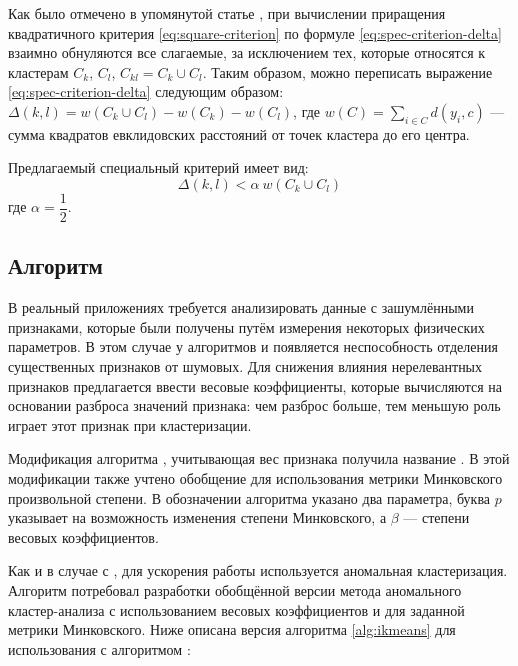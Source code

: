 \documentclass[12pt]{diploma}
\begin{document}
	Как было отмечено в упомянутой статье \cite{spec-criterion}, при вычислении приращения квадратичного критерия \eqref{eq:square-criterion}  по формуле \eqref{eq:spec-criterion-delta} взаимно обнуляются все слагаемые, за исключением тех, которые относятся к кластерам $ C_k $, $ C_l $, $ C_{kl} =C_k \cup C_l $. Таким образом, можно переписать выражение \eqref{eq:spec-criterion-delta} следующим образом: $ 		\Delta(k,l) = w(C_k \cup C_l) - w(C_k) - w(C_l) $, где $  w(C) = \sum_{i\in C}^{} d(y_i,c) $ --- сумма квадратов евклидовских расстояний от точек кластера до его центра. 
	
	Предлагаемый специальный критерий имеет вид:
 	\begin{equation*}
	 	\Delta(k,l) < \alpha\:w(C_k \cup C_l)
 	\end{equation*}
 	где $ \alpha=\dfrac{1}{2} $.
	
	\subsection{Алгоритм \AWardpb}
		В реальный приложениях требуется анализировать данные с зашумлёнными признаками, которые были получены путём измерения некоторых физических параметров. В этом случае у алгоритмов \Ward и \AWard появляется неспособность отделения существенных признаков от шумовых. Для снижения влияния нерелевантных признаков предлагается ввести весовые коэффициенты, которые вычисляются на основании разброса значений признака: чем разброс больше, тем меньшую роль играет этот признак при кластеризации. 
		
		Модификация алгоритма \AWard, учитывающая вес признака получила название \AWardpb. В этой модификации также учтено обобщение для использования метрики Минковского произвольной степени. В обозначении алгоритма указано два параметра, буква $ p $ указывает на возможность изменения степени Минковского, а $ \beta $ --- степени весовых коэффициентов.
		
		Как и в случае с \AWard, для ускорения работы используется аномальная кластеризация. Алгоритм \AWardpb потребовал разработки обобщённой версии метода аномального кластер-анализа с использованием весовых коэффициентов и для заданной метрики Минковского. Ниже описана версия алгоритма \ref{alg:ikmeans} для использования с алгоритмом \AWardpb:
		
\end{document}
